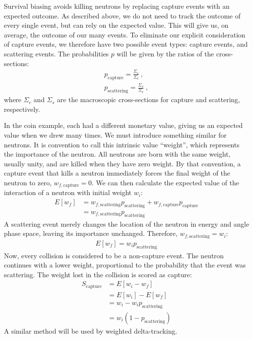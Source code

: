 Survival biasing avoids killing neutrons by replacing capture
events with an expected outcome. As described above, we do not need to
track the outcome of every single event, but can rely on the expected
value. This will give us, on average, the outcome of our many
events. To eliminate our explicit consideration of capture events,
we therefore have two possible event types: capture events, and
scattering events. The probabilities $p$ will be given by the
ratios of the cross-sections:
\begin{align*}
  p_{\mathrm{capture}} = \frac{\Sigma_{c}}{\Sigma_t} \:,\\
  p_{\mathrm{scattering}} = \frac{\Sigma_{s}}{\Sigma_t}\:,
\end{align*}
where $\Sigma_{c}$ and $\Sigma_{s}$ are the macroscopic cross-sections
for capture and scattering, respectively.

In the coin example, each had a different monetary value, giving us an
expected value when we drew many times. We must introduce something
similar for neutrons. It is convention to call this intrinsic value
``weight'', which represents the importance of the neutron. All neutrons
are born with the same weight, usually unity, and are killed when they
have zero weight. By that convention, a capture event that kills a
neutron immediately forces the final weight of the neutron to zero,
$w_{f,\mathrm{capture}} = 0$. We can then calculate the expected
value of the interaction of a neutron with initial weight $w_i$:
\begin{align*}
  E[w_f] &= w_{f,\mathrm{scattering}}p_\mathrm{scattering} +
           w_{f,\mathrm{capture}}p_\mathrm{capture} \\
  &= w_{f,\mathrm{scattering}}p_\mathrm{scattering}
\end{align*}
A scattering event merely changes the location of the neutron in
energy and angle phase space, leaving its importance
unchanged. Therefore, $w_{f,\mathrm{scattering}} = w_i$:
\begin{align*}
  E[w_f] = w_ip_\mathrm{scattering} 
\end{align*}
Now,
every collision is considered to be a non-capture event. The
neutron continues with a lower weight, proportional to the probability
that the event was scattering. The weight lost in the collision is
scored as capture:
\begin{align*}
  S_\mathrm{capture} &= E[w_i - w_f] \\
  &= E[w_i] - E[w_f] \\
&= w_i - w_ip_\mathrm{scattering} \\
&= w_i(1-p_\mathrm{scattering})
\end{align*}
A similar method will be used by weighted delta-tracking.

